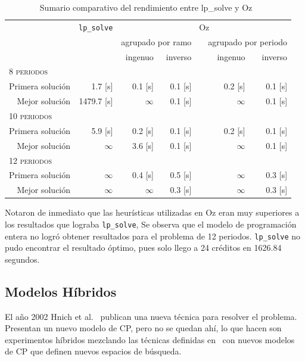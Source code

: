 \documentclass[letterpaper,10pt]{article}
\renewcommand{\arraystretch}{1.2}
\begin{document}
\begin{table}[H]
  \centering
  \renewcommand{\arraystretch}{1.1}
  \begin{tabular}{@{}p{3.6cm}rrrrrr@{}}
    \toprule[1.2pt]
      & \verb+lp_solve+ & \multicolumn{5}{c}{Oz}\\
     \cmidrule{3-7}
      &   &  \multicolumn{2}{c}{agrupado por ramo} &  & \multicolumn{2}{c}{agrupado por periodo}\\
      \cmidrule{3-4} \cmidrule{6-7}
      & & ingenuo & inverso & \phantom{a} & ingenuo & inverso\\
    \midrule
    \textsc{8 periodos}\\
    \multicolumn{1}{r}{Primera solución} & 1.7 [s] & 0.1 [s] & 0.1 [s] & \phantom{a} & 0.2 [s] & 0.1 [s]\\
    \multicolumn{1}{r}{Mejor solución}   & 1479.7 [s] & $\infty$ & 0.1 [s] & \phantom{a} & $\infty$ & 0.1 [s]\\
    \textsc{10 periodos}\\
    \multicolumn{1}{r}{Primera solución} & 5.9 [s] & 0.2 [s] & 0.1 [s] & \phantom{a} & 0.2 [s] & 0.1 [s]\\
    \multicolumn{1}{r}{Mejor solución}   & $\infty$ & 3.6 [s] & 0.1 [s] & \phantom{a} & $\infty$ & 0.1 [s]\\
    \textsc{12 periodos}\\
    \multicolumn{1}{r}{Primera solución} & $\infty$ & 0.4 [s] & 0.5 [s] & \phantom{a} & $\infty$ & 0.3 [s]\\
    \multicolumn{1}{r}{Mejor solución}   & $\infty$ & $\infty$ & 0.3 [s] & \phantom{a} & $\infty$ & 0.3 [s]\\
    \bottomrule
  \end{tabular}
  \caption{Sumario comparativo del rendimiento entre lp\_solve y Oz~\cite{DBLP:journals/corr/cs-PL-0110007}}
\end{table}

Notaron de inmediato que las heurísticas utilizadas en Oz eran muy superiores a los resultados que lograba \verb+lp_solve+, Se observa que el modelo de programación entera no logró obtener resultados para el problema de 12 periodos.
\verb+lp_solve+ no pudo encontrar el resultado óptimo, pues solo llego a 24 créditos en 1626.84 segundos.

\subsection{Modelos Híbridos}

El año 2002 Hnich et al.~\cite{Hnich02modellinga} publican una nueva técnica para resolver el problema. Presentan un nuevo modelo de CP, pero no se quedan ahí, lo que hacen son experimentos híbridos mezclando las técnicas definidas en~\cite{DBLP:journals/corr/cs-PL-0110007} con nuevos modelos de CP que definen nuevos espacios de búsqueda.
\end{document}
